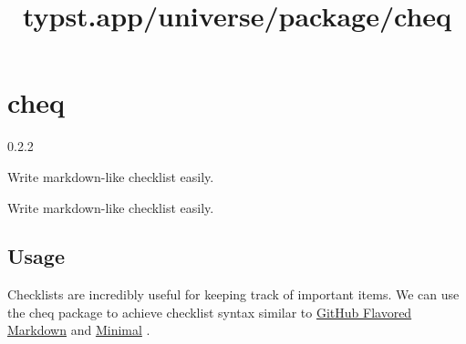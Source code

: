 \title{typst.app/universe/package/cheq}

\label{banner}
\section{cheq}\label{cheq}

{ 0.2.2 }

Write markdown-like checklist easily.

\label{readme}
Write markdown-like checklist easily.

\subsection{Usage}\label{usage}

Checklists are incredibly useful for keeping track of important items.
We can use the cheq package to achieve checklist syntax similar to
\href{https://github.github.com/gfm/\#task-list-items-extension-}{GitHub
Flavored Markdown} and \href{https://minimal.guide/checklists}{Minimal}
.

\begin{Shaded}
\begin{Highlighting}[]





\end{Highlighting}
\end{Shaded}


